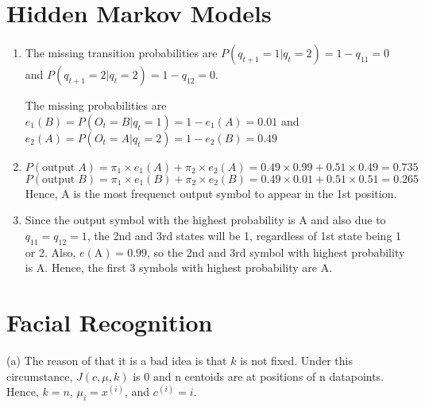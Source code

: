 \documentclass[11pt]{article}
\begin{document}
\section{Hidden Markov Models}
\begin{enumerate}[label=(\alph*)]
    \item
    The missing transition probabilities are $P(q_{t+1} = 1| q_t = 2) = 1-q_{11} = 0$ and $P(q_{t+1} = 2 | q_t = 2) = 1-q_{12} = 0$.

    The missing probabilities are $e_1(B) = P(O_t = B|q_t=1) =1-e_1(A) = 0.01$ and $e_2(A) = P(O_t = A | q_t = 2) = 1-e_2(B)= 0.49$
    
    \item
    $$P(\text{output}\; A) = \pi_1 \times e_1(A) + \pi_2 \times e_2(A) = 0.49\times 0.99 + 0.51 \times 0.49 = 0.735$$
    $$P(\text{output}\; B) = \pi_1 \times e_1(B) + \pi_2 \times e_2(B) = 0.49\times 0.01 + 0.51 \times 0.51 = 0.265$$
    Hence, A is the most frequenct output symbol to appear in the 1st position.

    \item 
    Since the output symbol with the highest probability is A and also due to $q_11 = q_12 = 1$, the 2nd and 3rd states will be 1, regardless of 1st state being 1 or 2. Also, $e(\text{A}) = 0.99$, so the 2nd and 3rd symbol with highest probability is A. Hence, the first 3 symbols with highest probability are A.


\end{enumerate}

\section{Facial Recognition}
(a) The reason of that it is a bad idea is that $k$ is not fixed. Under this circumstance, $J(c, \mu, k)$ is 0 and n centoids are at positions of n datapoints. Hence, $k = n$, $\mu_i = x^{(i)}$, and $c^{(i)} = i$.
\end{document}
